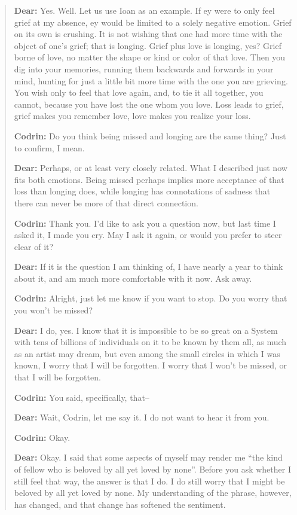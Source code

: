 \begin{quote}
\textbf{Dear:} Yes. Well. Let us use Ioan as an example. If ey were to only feel grief at my absence, ey would be limited to a solely negative emotion. Grief on its own is crushing. It is not wishing that one had more time with the object of one's grief; that is longing. Grief plus love is longing, yes? Grief borne of love, no matter the shape or kind or color of that love. Then you dig into your memories, running them backwards and forwards in your mind, hunting for just a little bit more time with the one you are grieving. You wish only to feel that love again, and, to tie it all together, you cannot, because you have lost the one whom you love. Loss leads to grief, grief makes you remember love, love makes you realize your loss.

\textbf{Codrin:} Do you think being missed and longing are the same thing? Just to confirm, I mean.

\textbf{Dear:} Perhaps, or at least very closely related. What I described just now fits both emotions. Being missed perhaps implies more acceptance of that loss than longing does, while longing has connotations of sadness that there can never be more of that direct connection.

\textbf{Codrin:} Thank you. I'd like to ask you a question now, but last time I asked it, I made you cry. May I ask it again, or would you prefer to steer clear of it?

\textbf{Dear:} If it is the question I am thinking of, I have nearly a year to think about it, and am much more comfortable with it now. Ask away.

\textbf{Codrin:} Alright, just let me know if you want to stop. Do you worry that you won't be missed?

\textbf{Dear:} I do, yes. I know that it is impossible to be so great on a System with tens of billions of individuals on it to be known by them all, as much as an artist may dream, but even among the small circles in which I was known, I worry that I will be forgotten. I worry that I won't be missed, or that I will be forgotten.

\textbf{Codrin:} You said, specifically, that--

\textbf{Dear:} Wait, Codrin, let me say it. I do not want to hear it from you.

\textbf{Codrin:} Okay.

\textbf{Dear:} Okay. I said that some aspects of myself may render me ``the kind of fellow who is beloved by all yet loved by none''. Before you ask whether I still feel that way, the answer is that I do. I do still worry that I might be beloved by all yet loved by none. My understanding of the phrase, however, has changed, and that change has softened the sentiment.


\end{quote}
